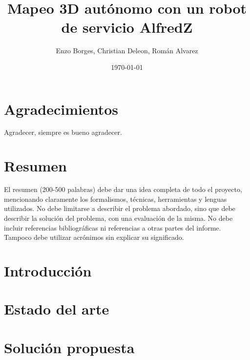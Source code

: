 \documentclass{prgrado}
\title{Mapeo 3D autónomo con un robot de servicio AlfredZ}
\author{Enzo Borges, Christian Deleon, Román Alvarez}
\date{\today}
\begin{document}

\frontmatter

\maketitle

\chapter*{Agradecimientos}
Agradecer, siempre es bueno agradecer.

\chapter*{Resumen}
El resumen (200-500 palabras) debe dar una idea completa de todo el
proyecto, mencionando claramente los formalismos, técnicas, herramientas y lenguas
utilizados. No debe limitarse a describir el problema abordado, sino que debe describir
la solución del problema, con una evaluación de la misma. No debe incluir referencias
bibliográficas ni referencias a otras partes del informe. Tampoco debe utilizar
acrónimos sin explicar su significado.

\vfill
{}

\tableofcontents
\newpage


\mainmatter

\chapter{Introducción}


\chapter{Estado del arte}


\chapter{Solución propuesta}

\end{document}

